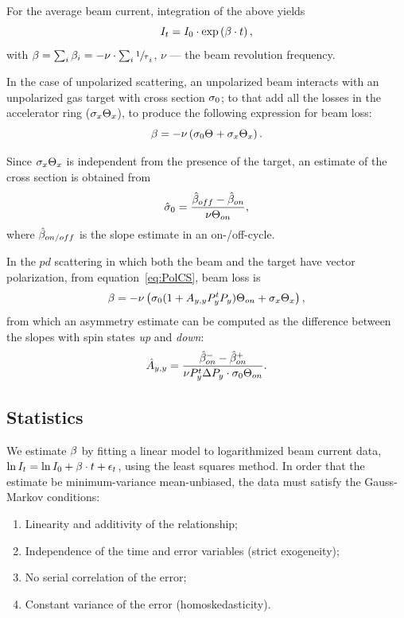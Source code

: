 \documentclass[reprint, superscriptaddress]{revtex4-1}
\begin{document}
For the average beam current, integration of the above yields
\begin{equation}\label{eq:CurrentDecay}
	I_t = I_0 \cdot \exp\bkt{\slp\cdot t},
\end{equation}
with $\slp = \sum_i \slp[i] = - \nu\cdot\sum_i \sfrac1\tau_i$, $\nu$ --- the beam revolution frequency. 

In the case of unpolarized scattering, an unpolarized beam interacts with an unpolarized gas target with cross section $\CS[0]$; to that add all the losses in the accelerator ring ($\CS[x]\Thick[x]$), to produce the following expression for beam loss:
\begin{equation}\label{eq:SlopeModel}
	\slp = -\nu\bkt{\CS[0]\Thick + \CS[x]\Thick[x]}.
\end{equation}

Since $\CS[x]\Thick[x]$ is independent from the presence of the target, an estimate of the cross section is obtained from  
\begin{equation}
	\CS*[0] = \frac{\slp*[off] - \slp*[on]}{\nu\Thick[on]},
\end{equation}
where $\slp*[on/off]$ is the slope estimate in an on-/off-cycle.

In the $pd$ scattering in which both the beam and the target have vector polarization, from equation~\eqref{eq:PolCS}, beam loss is
\[
	\slp = -\nu\bkt{\CS[0](1 + \Ayy P_y^t P_y)\Thick[on] + \CS[x]\Thick[x]},
\]
from which an asymmetry estimate can be computed as the difference between the slopes with spin states \emph{up} and \emph{down}:
\begin{equation}\label{eq:AyyEst}
	\Ayy* = \frac{\slp*[on]^- - \slp*[on]^+}{\nu P_y^t\Delta P_y\cdot \CS[0]\Thick[on]}.
\end{equation}

\subsection{Statistics}

We estimate $\slp$ by fitting a linear model to logarithmized beam current data, $\ln I_t = \ln I_0 + \slp\cdot t + \epsilon_t$, using the least squares method. In order that the estimate be minimum-variance mean-unbiased, the data must satisfy the Gauss-Markov conditions: %
\begin{enumerate}
	\item Linearity and additivity of the relationship;
	\item Independence of the time and error variables (strict exogeneity);
	\item No serial correlation of the error;
	\item Constant variance of the error (homoskedasticity).
\end{enumerate}
\end{document}
